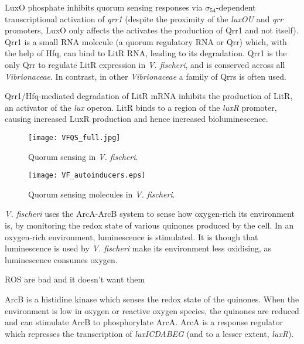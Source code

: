 LuxO phosphate inhibits quorum sensing responses via $\sigma_{54}$-dependent transcriptional activation of \textit{qrr1}\cite{Miyamoto2000,Miyashiro2010} (despite the proximity of the \textit{luxOU} and \textit{qrr} promoters, LuxO only affects the activates the production of Qrr1 and not itself\cite{Lilley2000}). Qrr1 is a small RNA molecule (a quorum regulatory RNA or Qrr) which, with the help of Hfq, can bind to LitR RNA, leading to its degradation\cite{Miyashiro2010}. Qrr1 is the only Qrr to regulate LitR expression in \textit{V. fischeri}, and is conserved across all \textit{Vibrionaceae}\cite{Miyashiro2010}. In contrast, in other \textit{Vibrionaceae} a family of Qrrs is often used\cite{Lenz2004}.

Qrr1/Hfq-mediated degradation of LitR mRNA inhibits the production of LitR, an activator of the \textit{lux} operon. LitR binds to a region of the \textit{luxR} promoter, causing increased LuxR production and hence increased bioluminescence\cite{Fidopiastis2002}.


\begin{figure}[H]
	\begin{center}
		\texttt{[image: VFQS\_full.jpg]}
		\caption{Quorum sensing in \textit{V. fischeri}. \label{fig:VFQS_full}}
	\end{center}
\end{figure}

\begin{figure}[H]
	\begin{center}
		\texttt{[image: VF\_autoinducers.eps]}
		\caption{Quorum sensing molecules in \textit{V. fischeri}. \label{fig:VF_autoinducers}}
	\end{center}
\end{figure}

 \label{sec:O2}

\textit{V. fischeri} uses the ArcA-ArcB system to sense how oxygen-rich its environment is, by monitoring the redox state of various quinones produced by the cell. 
In an oxygen-rich environment, luminescence is stimulated. It is though that luminescence is used by \textit{V. fischeri} make its environment less oxidising, as luminescence consumes oxygen. 

ROS are bad and it doesn't want them\cite{Visick2000}

 ArcB is a histidine kinase which senses the redox state of the quinones. When the environment is low in oxygen or reactive oxygen species, the quinones are reduced and can stimulate ArcB to phosphorylate ArcA. ArcA is a response regulator which represses the transcription of \textit{luxICDABEG} (and to a lesser extent, \textit{luxR}). 

